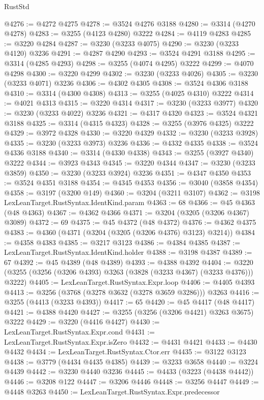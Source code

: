 \begin{lexlean}{RustStd}
\begin{coremodule}
{\begin{coremodule}
{{{{{{{{{{{{{{{{{{{{{{{{{{{{{{{{{{{{{@4276 := @4272 @4275
@4278 := @3524 @4276 @3188
@4280 := @3314 (@4270 @4278)
@4283 := @3255 (@4123 @4280) @3222
@4284 := @4119 @4283
@4285 := @3220 @4284
@4287 := @3230 (@3233 @4075)
@4290 := @3230 (@3233 @4120) @3236
@4291 := @4287 @4290
@4293 := @3524 @4291 @3188
@4295 := @3314 (@4285 @4293)
@4298 := @3255 (@4074 @4295) @3222
@4299 := @4070 @4298
@4300 := @3220 @4299
@4302 := @3230 (@3233 @4026)
@4305 := @3230 (@3233 @4071) @3236
@4306 := @4302 @4305
@4308 := @3524 @4306 @3188
@4310 := @3314 (@4300 @4308)
@4313 := @3255 (@4025 @4310) @3222
@4314 := @4021 @4313
@4315 := @3220 @4314
@4317 := @3230 (@3233 @3977)
@4320 := @3230 (@3233 @4022) @3236
@4321 := @4317 @4320
@4323 := @3524 @4321 @3188
@4325 := @3314 (@4315 @4323)
@4328 := @3255 (@3976 @4325) @3222
@4329 := @3972 @4328
@4330 := @3220 @4329
@4332 := @3230 (@3233 @3928)
@4335 := @3230 (@3233 @3973) @3236
@4336 := @4332 @4335
@4338 := @3524 @4336 @3188
@4340 := @3314 (@4330 @4338)
@4343 := @3255 (@3927 @4340) @3222
@4344 := @3923 @4343
@4345 := @3220 @4344
@4347 := @3230 (@3233 @3859)
@4350 := @3230 (@3233 @3924) @3236
@4351 := @4347 @4350
@4353 := @3524 @4351 @3188
@4354 := @4345 @4353
@4356 := @3040 (@3858 @4354)
@4358 := @3197 (@3200 @149)
@4360 := @3204 (@3211 @3107)
@4362 := @3198 LexLeanTarget.RustSyntax.IdentKind.param
@4363 := 68
@4366 := @45 @4363 (@48 @4363)
@4367 := @4362 @4366
@4371 := @3204 (@3205 (@3206 @4367) @3089)
@4372 := 69
@4375 := @45 @4372 (@48 @4372)
@4376 := @4362 @4375
@4383 := @4360 (@4371 (@3204 (@3205 (@3206 @4376) @3123) @3214))
@4384 := @4358 @4383
@4385 := @3217 @3123
@4386 := @4384 @4385
@4387 := LexLeanTarget.RustSyntax.IdentKind.holder
@4388 := @3198 @4387
@4389 := 67
@4392 := @45 @4389 (@48 @4389)
@4393 := @4388 @4392
@4404 := @3220 (@3255 (@3256 (@3206 @4393) @3263 (@3828 (@3233 @4367) (@3233 @4376))) @3222)
@4405 := LexLeanTarget.RustSyntax.Expr.loop
@4406 := @4405 @4393
@4413 := @3256 (@3768 (@3278 @3632 (@3278 @3659 @3286))) @3263
@4416 := @3255 (@4413 (@3233 @4393))
@4417 := 65
@4420 := @45 @4417 (@48 @4417)
@4421 := @4388 @4420
@4427 := @3255 (@3256 (@3206 @4421) @3263 @3675) @3222
@4429 := @3220 (@4416 @4427)
@4430 := LexLeanTarget.RustSyntax.Expr.cond
@4431 := LexLeanTarget.RustSyntax.Expr.isZero
@4432 := @4431 @4421
@4433 := @4430 @4432
@4434 := LexLeanTarget.RustSyntax.Ctor.err
@4435 := @3122 @3123
@4438 := @3779 (@4434 @4435 @4385)
@4439 := @3233 @3658
@4440 := @3224 @4439
@4442 := @3230 @4440 @3236
@4445 := @4433 (@3223 (@4438 @4442))
@4446 := @3208 @122
@4447 := @3206 @4446
@4448 := @3256 @4447
@4449 := @4448 @3263
@4450 := LexLeanTarget.RustSyntax.Expr.predecessor
}}}}}}}}}}}}}}}}}}}}}}}}}}}}}}}}}}}}}
\end{coremodule}}
\end{coremodule}
\end{lexlean}
